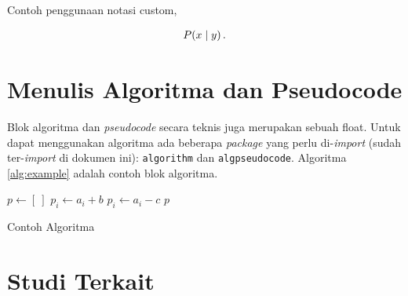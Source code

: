 Contoh penggunaan notasi custom,

\begin{align}
    P(x \mid y)\,.
\label{eq:contoh_equation_custom}
\end{align}

\section{Menulis Algoritma dan Pseudocode}

Blok algoritma dan \textit{pseudocode} secara teknis juga merupakan sebuah float. Untuk dapat menggunakan algoritma ada beberapa \textit{package} yang perlu di-\textit{import} (sudah ter-\textit{import} di dokumen ini): \texttt{algorithm} dan \texttt{algpseudocode}. Algoritma \ref{alg:example} adalah contoh blok algoritma.

\begin{algorithm}
	\begin{algorithmic}[1]
		\State $p \gets [~]$
				\State $p_i \gets a_i + b$
			\Else
				\State $p_i \gets a_i - c$
			\EndIf
		\EndFor
		\State \Return $p$
		\EndFunction
	\end{algorithmic}
	\caption{Contoh Algoritma}
	\label{alg:example}
\end{algorithm}

\section{Studi Terkait}
\blindtext
